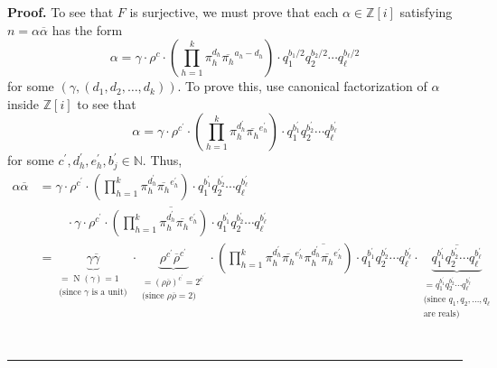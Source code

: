 \documentclass[numbers=enddot,12pt,final,onecolumn,notitlepage]{scrartcl}%
\numberwithin{exer}{subsection}
\theoremstyle{definition}
\newenvironment{proof}[1][Proof]{\noindent\textbf{#1.} }{\ \rule{0.5em}{0.5em}}
\let\prodnonlimits\prod
\renewcommand{\prod}{\prodnonlimits\limits}
\begin{document}
\begin{proof}
To see that $F$ is surjective, we must prove that each $\alpha\in
\mathbb{Z}\left[  i\right]  $ satisfying $n=\alpha\overline{\alpha}$ has the
form
\[
\alpha=\gamma\cdot\rho^{c}\cdot\left(  \prod_{h=1}^{k}\pi_{h}^{d_{h}}%
\overline{\pi_{h}}^{a_{h}-d_{h}}\right)  \cdot q_{1}^{b_{1}/2}q_{2}^{b_{2}%
/2}\cdots q_{\ell}^{b_{\ell}/2}%
\]
for some $\left(  \gamma,\left(  d_{1},d_{2},\ldots,d_{k}\right)  \right)  $.
To prove this, use canonical factorization of $\alpha$ inside $\mathbb{Z}%
\left[  i\right]  $ to see that%
\begin{equation}
\alpha=\gamma\cdot\rho^{c^{\prime}}\cdot\left(  \prod_{h=1}^{k}\pi_{h}%
^{d_{h}^{\prime}}\overline{\pi_{h}}^{e_{h}^{\prime}}\right)  \cdot
q_{1}^{b_{1}^{\prime}}q_{2}^{b_{2}^{\prime}}\cdots q_{\ell}^{b_{\ell}^{\prime
}} \label{pf.thm.Z[i].count-xx+yy.b.al=2}%
\end{equation}
for some $c^{\prime},d_{h}^{\prime},e_{h}^{\prime},b_{j}^{\prime}\in
\mathbb{N}$. Thus,%
\begin{align*}
\alpha\overline{\alpha}  &  =\gamma\cdot\rho^{c^{\prime}}\cdot\left(
\prod_{h=1}^{k}\pi_{h}^{d_{h}^{\prime}}\overline{\pi_{h}}^{e_{h}^{\prime}%
}\right)  \cdot q_{1}^{b_{1}^{\prime}}q_{2}^{b_{2}^{\prime}}\cdots q_{\ell
}^{b_{\ell}^{\prime}}\\
&  \ \ \ \ \ \ \ \ \ \ \cdot\overline{\gamma\cdot\rho^{c^{\prime}}\cdot\left(
\prod_{h=1}^{k}\pi_{h}^{d_{h}^{\prime}}\overline{\pi_{h}}^{e_{h}^{\prime}%
}\right)  \cdot q_{1}^{b_{1}^{\prime}}q_{2}^{b_{2}^{\prime}}\cdots q_{\ell
}^{b_{\ell}^{\prime}}}\\
&  =\underbrace{\gamma\overline{\gamma}}_{\substack{=\operatorname*{N}\left(
\gamma\right)  =1\\\text{(since }\gamma\text{ is a unit)}}}\cdot
\underbrace{\rho^{c^{\prime}}\overline{\rho}^{c^{\prime}}}_{\substack{=\left(
\rho\overline{\rho}\right)  ^{c^{\prime}}=2^{c^{\prime}}\\\text{(since }%
\rho\overline{\rho}=2\text{)}}}\cdot\left(  \prod_{h=1}^{k}\pi_{h}%
^{d_{h}^{\prime}}\overline{\pi_{h}}^{e_{h}^{\prime}}\overline{\pi_{h}%
^{d_{h}^{\prime}}\overline{\pi_{h}}^{e_{h}^{\prime}}}\right)  \cdot
q_{1}^{b_{1}^{\prime}}q_{2}^{b_{2}^{\prime}}\cdots q_{\ell}^{b_{\ell}^{\prime
}}\cdot\underbrace{\overline{q_{1}^{b_{1}^{\prime}}q_{2}^{b_{2}^{\prime}%
}\cdots q_{\ell}^{b_{\ell}^{\prime}}}}_{\substack{=q_{1}^{b_{1}^{\prime}}%
q_{2}^{b_{2}^{\prime}}\cdots q_{\ell}^{b_{\ell}^{\prime}}\\\text{(since }%
q_{1},q_{2},\ldots,q_{\ell}\\\text{are reals)}}}\\

\end{align*}
\end{proof}
\end{document}
